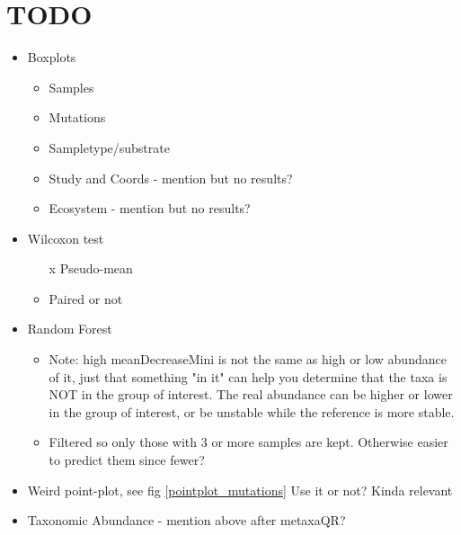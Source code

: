\section{TODO}
\begin{itemize}
    \item Boxplots
        \begin{itemize}
            \item Samples
            \item Mutations
            \item Sampletype/substrate
            \item Study and Coords - mention but no results?
            \item Ecosystem - mention but no results?
        \end{itemize}
    \item Wilcoxon test
        \begin{itemize}
            \item[x] Pseudo-mean
            \item Paired or not
        \end{itemize}
    \item Random Forest
        \begin{itemize}
            \item Note: high meanDecreaseMini is not the same as high or low abundance of it, just that something "in it" can help you determine that the taxa is NOT in the group of interest. The real abundance can be higher or lower in the group of interest, or be unstable while the reference is more stable.
            \item Filtered so only those with 3 or more samples are kept. Otherwise easier to predict them since fewer?
        \end{itemize}
    \item Weird point-plot, see fig \ref{pointplot_mutations}
        \subitem Use it or not? Kinda relevant
    \item Taxonomic Abundance - mention above after metaxaQR?
\end{itemize}














